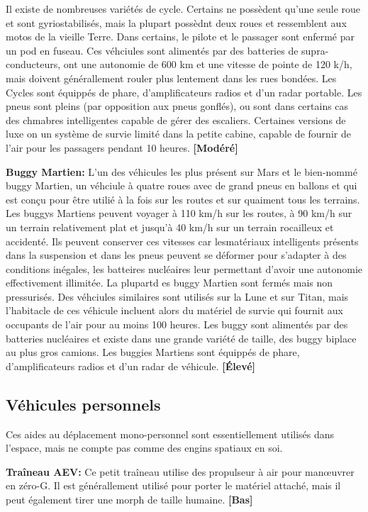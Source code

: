 {Il existe de nombreuses variétés de cycle. Certains ne possèdent qu'une seule roue et sont gyriostabilisés, mais la plupart possèdnt deux roues et ressemblent aux motos de la vieille Terre. Dans certains, le pilote et le passager sont enfermé par un pod en fuseau. Ces véhciules sont alimentés par des batteries de supra-conducteurs, ont une autonomie de 600 km et une vitesse de pointe de 120 k/h, mais doivent générallement rouler plus lentement dans les rues bondées. Les Cycles sont équippés de phare, d'amplificateurs radios et d'un radar portable. Les pneus sont pleins (par opposition aux pneus gonflés), ou sont dans certains cas des chmabres intelligentes capable de gérer des escaliers. Certaines versions de luxe on un système de survie limité dans la petite cabine, capable de fournir de l'air pour les passagers pendant 10 heures. \textbf{[Modéré]} 

\textbf{Buggy Martien:} L'un des véhicules les plus présent sur Mars et le bien-nommé buggy Martien, un véhciule à quatre roues avec de grand pneus en ballons et qui est conçu pour être utilié à la fois sur les routes et sur quaiment tous les terrains. Les buggys Martiens peuvent voyager à 110 km/h sur les routes, à 90 km/h sur un terrain relativement plat et jusqu'à 40 km/h sur un terrain rocailleux et accidenté. Ils peuvent conserver ces vitesses car lesmatériaux intelligents présents dans la suspension et dans les pneus peuvent se déformer pour s'adapter à des conditions inégales, les batteires nucléaires leur permettant d'avoir une autonomie effectivement illimitée. La plupartd es buggy Martien sont fermés mais non pressurisés. Des véhciules similaires sont utilisés sur la Lune et sur Titan, mais l'habitacle de ces véhicule incluent alors du matériel de survie qui fournit aux occupants de l'air pour au moins 100 heures. Les buggy sont alimentés par des batteries nucléaires et existe dans une grande variété de taille, des buggy biplace au plus gros camions. Les buggies Martiens sont équippés de phare, d'amplificateurs radios et d'un radar de véhicule. \textbf{[Élevé]} 

\subsection{Véhicules personnels} \label{sec:personal-vehicles} 

Ces aides au déplacement mono-personnel sont essentiellement utilisés dans l'espace, mais ne compte pas comme des engins spatiaux en soi. 

\textbf{Traîneau AEV:} Ce petit traîneau utilise des propulseur à air pour manœuvrer en zéro-G. Il est générallement utilisé pour porter le matériel attaché, mais il peut également tirer une morph de taille humaine. \textbf{[Bas]} 

}
